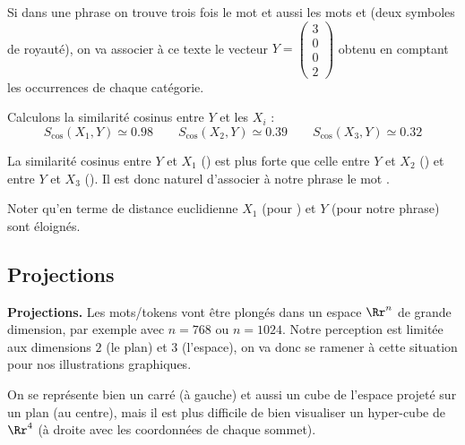 \documentclass[11pt,class=report,crop=false]{standalone}
\begin{document}
\begin{exemple}
Si dans une phrase on trouve trois fois le mot  et aussi les mots  et  (deux symboles de royauté), on va associer à ce texte le vecteur $Y = \left(\begin{smallmatrix}3\\0\\0\\2\end{smallmatrix}\right)$ obtenu en comptant les occurrences de chaque catégorie.

Calculons la similarité cosinus entre $Y$ et les $X_i$ :
$$
S_{\cos}(X_1,Y) \simeq 0.98 \qquad
S_{\cos}(X_2,Y) \simeq 0.39 \qquad
S_{\cos}(X_3,Y) \simeq 0.32 
$$

La similarité cosinus entre $Y$ et $X_1$ () est plus forte que celle entre $Y$ et $X_2$ () et entre $Y$ et  $X_3$ (). Il est donc naturel d'associer à notre phrase le mot .


Noter qu'en terme de distance euclidienne $X_1$ (pour ) et $Y$ (pour notre phrase) sont éloignés.
\end{exemple}


\subsection{Projections}

\textbf{Projections.}
Les mots/tokens vont être plongés dans un espace $\Rr^n$ de grande dimension, par exemple avec $n=768$ ou $n=1024$. 
Notre perception est limitée aux dimensions $2$ (le plan) et $3$ (l'espace), on va donc se ramener à cette situation pour nos illustrations graphiques.

On se représente bien un carré (à gauche) et aussi un cube de l'espace projeté sur un plan (au centre), mais il est plus difficile de bien visualiser un hyper-cube de $\Rr^4$ (à droite avec les coordonnées de chaque sommet).


\begin{center}
\begin{minipage}{0.25\textwidth}
\end{minipage}
\begin{minipage}{0.3\textwidth}
\end{minipage}	
\begin{minipage}{0.4\textwidth}
\end{minipage} 
\end{center}
\end{document}
